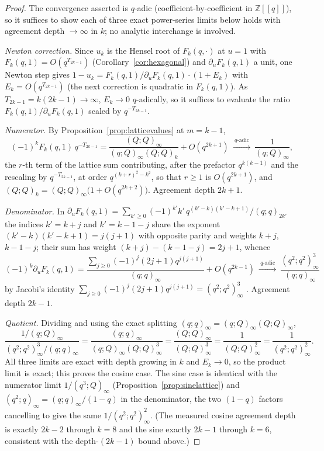 \documentclass[11pt]{article}
\theoremstyle{plain}
\theoremstyle{definition}
\theoremstyle{remark}
\newcommand{\Z}{\mathbb{Z}}
\begin{document}
\begin{proof}
The convergence asserted is $q$-adic (coefficient-by-coefficient in $\Z[[q]]$), so it suffices to
show each of three exact power-series limits below holds with agreement depth $\to\infty$ in $k$;
no analytic interchange is involved.

\emph{Newton correction.} Since $u_k$ is the Hensel root of $F_k(q,\cdot)$ at $u=1$ with
$F_k(q,1)=O(q^{T_{2k-1}})$ (Corollary~\ref{cor:hexagonal}) and $\partial_uF_k(q,1)$ a unit,
one Newton step gives
$1-u_k=F_k(q,1)/\partial_uF_k(q,1)\cdot(1+E_k)$ with $E_k=O(q^{T_{2k-1}})$ (the next correction is
quadratic in $F_k(q,1)$). As $T_{2k-1}=k(2k-1)\to\infty$, $E_k\to0$ $q$-adically, so it suffices to
evaluate the ratio $F_k(q,1)/\partial_uF_k(q,1)$ scaled by $q^{-T_{2k-1}}$.

\emph{Numerator.} By Proposition~\ref{prop:latticevalues} at $m=k-1$,
\[
   (-1)^kF_k(q,1)\,q^{-T_{2k-1}}
   =\frac{(Q;Q)_\infty}{(q;Q)_\infty(Q;Q)_k}+O(q^{2k+1})
   \ \xrightarrow{\ q\text{-adic}\ }\ \frac1{(q;Q)_\infty},
\]
the $r$-th term of the lattice sum contributing, after the prefactor $q^{k(k-1)}$ and the
rescaling by $q^{-T_{2k-1}}$, at order $q^{(k+r)^2-k^2}$, so that $r\ge1$ is $O(q^{2k+1})$, and
$(Q;Q)_k=(Q;Q)_\infty\bigl(1+O(q^{2k+2})\bigr)$. Agreement depth $2k+1$.

\emph{Denominator.} In $\partial_uF_k(q,1)=\sum_{k'\ge0}(-1)^{k'}k'\,q^{(k'-k)(k'-k+1)}/(q;q)_{2k'}$
the indices $k'=k+j$ and $k'=k-1-j$ share the exponent $(k'-k)(k'-k+1)=j(j+1)$ with opposite parity
and weights $k+j$, $k-1-j$; their sum has weight $(k+j)-(k-1-j)=2j+1$, whence
\[
   (-1)^k\partial_uF_k(q,1)
   =\frac{\sum_{j\ge0}(-1)^j(2j+1)q^{j(j+1)}}{(q;q)_\infty}+O(q^{2k-1})
   \ \xrightarrow{\ q\text{-adic}\ }\ \frac{(q^2;q^2)_\infty^{3}}{(q;q)_\infty}
\]
by Jacobi's identity $\sum_{j\ge0}(-1)^j(2j+1)q^{j(j+1)}=(q^2;q^2)_\infty^3$
\cite{Jacobi1829}. Agreement depth $2k-1$.

\emph{Quotient.} Dividing and using the exact splitting $(q;q)_\infty=(q;Q)_\infty(Q;Q)_\infty$,
\[
   \frac{1/(q;Q)_\infty}{(q^2;q^2)_\infty^{3}/(q;q)_\infty}
   =\frac{(q;q)_\infty}{(q;Q)_\infty(Q;Q)_\infty^{3}}
   =\frac{(Q;Q)_\infty}{(Q;Q)_\infty^{3}}
   =\frac1{(Q;Q)_\infty^{2}}=\frac1{(q^2;q^2)_\infty^{2}}.
\]
All three limits are exact with depth growing in $k$ and $E_k\to0$, so the product limit is exact;
this proves the cosine case. The sine case is identical with the numerator limit
$1/(q^3;Q)_\infty$ (Proposition~\ref{prop:sinelattice}) and $(q^2;q)_\infty=(q;q)_\infty/(1-q)$ in
the denominator, the two $(1-q)$ factors cancelling to give the same $1/(q^2;q^2)_\infty^{2}$.
(The measured cosine agreement depth is exactly $2k-2$ through $k=8$ and the sine exactly
$2k-1$ through $k=6$, consistent with the depth-$(2k-1)$ bound above.)
\end{proof}
\end{document}
